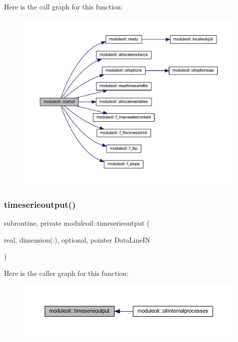 Here is the call graph for this function\+:\nopagebreak
\begin{figure}[H]
\begin{center}
\leavevmode
\includegraphics[width=350pt]{namespacemoduleoil_a65a42d1b037b7effaac748ed9de641b9_cgraph}
\end{center}
\end{figure}
\mbox{\label{namespacemoduleoil_ac0b9f29833f831cd80144ac91359798f}} 
\subsubsection{\texorpdfstring{timeserieoutput()}{timeserieoutput()}}
{\footnotesize\ttfamily subroutine, private moduleoil\+::timeserieoutput (\begin{DoxyParamCaption}\item[{real, dimension(\+:), optional, pointer}]{Data\+Line\+IN }\end{DoxyParamCaption})\hspace{0.3cm}{\ttfamily [private]}}

Here is the caller graph for this function\+:\nopagebreak
\begin{figure}[H]
\begin{center}
\leavevmode
\includegraphics[width=350pt]{namespacemoduleoil_ac0b9f29833f831cd80144ac91359798f_icgraph}
\end{center}
\end{figure}
\mbox{\label{namespacemoduleoil_a2fe92325448f8b8b46f0b9a6c44129c1}} 
